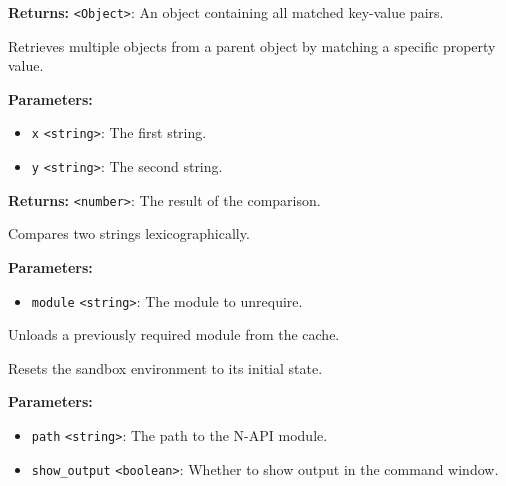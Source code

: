 \documentclass[12pt,a4paper]{article}
\begin{document}
\noindent \textbf{Returns:} \texttt{<Object>}: An object containing all matched key-value pairs.

\noindent Retrieves multiple objects from a parent object by matching a specific property value.

\vspace{5mm}
\noindent {}


\noindent \textbf{Parameters:}
\begin{itemize}
  \item \texttt{x} \texttt{<string>}: The first string.
  \item \texttt{y} \texttt{<string>}: The second string.
\end{itemize}

\noindent \textbf{Returns:} \texttt{<number>}: The result of the comparison.

\noindent Compares two strings lexicographically.

\vspace{5mm}
\noindent {}


\noindent \textbf{Parameters:}
\begin{itemize}
  \item \texttt{module} \texttt{<string>}: The module to unrequire.
\end{itemize}

\noindent Unloads a previously required module from the cache.

\vspace{5mm}
\noindent {}


\noindent Resets the sandbox environment to its initial state.

\vspace{5mm}
\noindent {}


\noindent \textbf{Parameters:}
\begin{itemize}
  \item \texttt{path} \texttt{<string>}: The path to the N-API module.
  \item \texttt{show\_output} \texttt{<boolean>}: Whether to show output in the command window.
\end{itemize}
\end{document}
